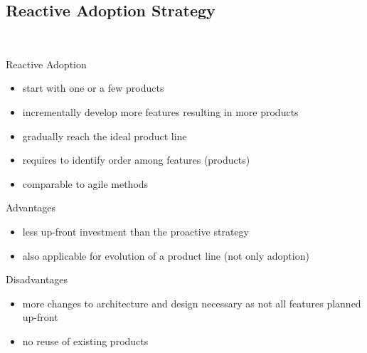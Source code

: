 \subsection{Reactive Adoption Strategy}
\begin{frame}{\myframetitle\ }
	\begin{fancycolumns}[animation=none]
		\begin{definition}{Reactive Adoption}
			\begin{itemize}
				\item start with one or a few products
				\item incrementally develop more features resulting in more products
				\item gradually reach the ideal product line
				\item requires to identify order among features (products)
				\item comparable to agile methods
			\end{itemize}
		\end{definition}
	\nextcolumn
		\begin{note}{Advantages}
			\begin{itemize}
				\item less up-front investment than the proactive strategy
				\item also applicable for evolution of a product line (not only adoption)
			\end{itemize}
		\end{note}
		\begin{note}{Disadvantages}
			\begin{itemize}
				\item more changes to architecture and design necessary as not all features planned up-front
				\item no reuse of existing products
			\end{itemize}
		\end{note}
	\end{fancycolumns}
\end{frame}

